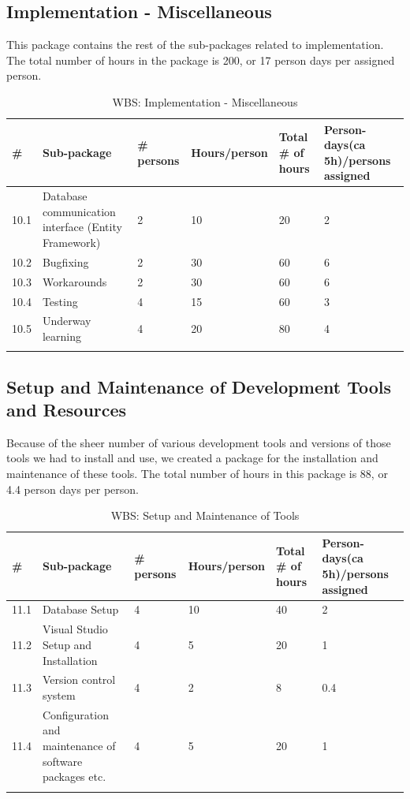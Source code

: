 \newpage
\subsection{Implementation - Miscellaneous}
This package contains the rest of the sub-packages related to implementation. The total number of hours in the package is 200, or 17 person days per assigned person.
\begin{longtable}{|p{0.7cm}|p{3cm}|p{1.8cm}|p{2.5cm}|p{2cm}|p{2.8cm}|}
\hline
\# & Sub-package & \# persons & Hours/person & Total \# of hours & Person-days(ca 5h)/persons assigned\\ 
\hline
10.1 & Database communication interface (Entity Framework) & 2 & 10 & 20 & 2\\ 
\hline
10.2 & Bugfixing & 2 & 30 & 60 & 6\\ 
\hline
10.3 & Workarounds & 2 & 30 & 60 & 6\\ 
\hline
10.4 & Testing & 4 & 15 & 60 & 3\\ 
\hline
10.5 & Underway learning & 4 & 20 & 80 & 4\\ 
\hline
\caption{WBS: Implementation - Miscellaneous}
\end{longtable}

\newpage
\subsection{Setup and Maintenance of Development Tools and Resources}
Because of the sheer number of various development tools and versions of those tools we had to install and use, we created a package for the installation and maintenance of these tools. The total number of hours in this package is 88, or 4.4 person days per person.
\begin{longtable}{|p{0.7cm}|p{3cm}|p{1.8cm}|p{2.5cm}|p{2cm}|p{2.8cm}|}
\hline
\# & Sub-package & \# persons & Hours/person & Total \# of hours & Person-days(ca 5h)/persons assigned\\ 
\hline
11.1 & Database Setup & 4 & 10 & 40 & 2\\ 
\hline
11.2 & Visual Studio Setup and Installation & 4 & 5 & 20 & 1\\
\hline
11.3 & Version control system & 4 & 2 & 8 & 0.4\\ 
\hline
11.4 & Configuration and maintenance of software packages etc. & 4 & 5 & 20 & 1\\ 
\hline
\caption{WBS: Setup and Maintenance of Tools}
\end{longtable}

